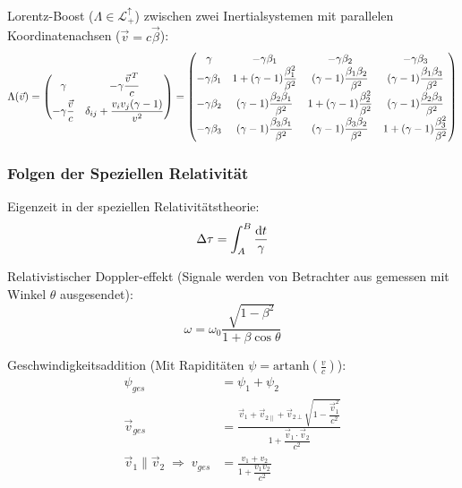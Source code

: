 			\noindent
			Lorentz-Boost ($\Lambda\in\mathcal{L}^\uparrow_+$) zwischen zwei Inertialsystemen mit parallelen Koordinatenachsen ($\vec{v}=c\vec{\beta}$):
			\begin{equation}
				\Lambda(\vec{v}) = \left( \begin{matrix}
					\gamma & -\gamma\dfrac{\pvec{v}^T}{c} \\[6pt]
					-\gamma\dfrac{\vec{v}}{c} & \delta_{ij}+\dfrac{v_i v_j(\gamma-1)}{v^2}
					\end{matrix} \right)
					=
					\left(\begin{matrix}
						\gamma & -\gamma \beta_1 & -\gamma \beta_2 & -\gamma \beta_3 \\
						-\gamma \beta_1 & 1+(\gamma -1){\dfrac {\beta_1^{2}}{\beta^{2}}} & (\gamma -1){\dfrac {\beta_1 \beta_2}{\beta^{2}}}&(\gamma -1){\dfrac {\beta_1\beta_3}{\beta^{2}}} \\
						-\gamma \beta_2 & (\gamma -1){\dfrac {\beta_2\beta_1}{\beta^{2}}} & 1+(\gamma -1){\dfrac {\beta_2^{2}}{\beta^{2}}}&(\gamma -1){\dfrac {\beta_2 \beta_3}{\beta^{2}}} \\
						-\gamma \beta_3 &(\gamma -1){\dfrac {\beta_3\beta_1}{\beta^{2}}}&(\gamma -1){\dfrac {\beta_3\beta_2}{\beta^{2}}}&1+(\gamma -1){\dfrac {\beta_3^{2}}{\beta^{2}}}
					\end{matrix}\right)
			\end{equation}

		\subsubsection{Folgen der Speziellen Relativität}
			\noindent
			Eigenzeit in der speziellen Relativitätstheorie:
			\begin{equation}
				\Delta\tau = \int_A^B \frac{\mathrm{d} t}{\gamma}
			\end{equation}

			\noindent
			Relativistischer Doppler-effekt (Signale werden von Betrachter aus gemessen mit Winkel $\theta$ ausgesendet):
			\begin{equation}
				\omega = \omega_0\frac{\sqrt{1-\beta^2}}{1+\beta\cos\theta}
			\end{equation}

			\noindent
			Geschwindigkeitsaddition (Mit Rapiditäten $\psi = \mathrm{artanh}\left(\frac{v}{c}\right)$):
			\begin{equation}
				\begin{aligned}
					\psi_{ges} &= \psi_1+\psi_2 \\
					\vec{v}_{ges} &= \frac{\vec{v}_1+\vec{v}_{2\parallel}+\vec{v}_{2\perp}\sqrt{1-\dfrac{\vec{v}_1^2}{c^2}}}{1+\dfrac{\vec{v}_1\cdot\vec{v}_2}{c^2}} \\
					\vec{v}_1\parallel\vec{v}_2 \;\Rightarrow\; v_{ges} &= \frac{v_1+v_2}{1+\dfrac{v_1 v_2}{c^2}}
				\end{aligned}
			\end{equation}

